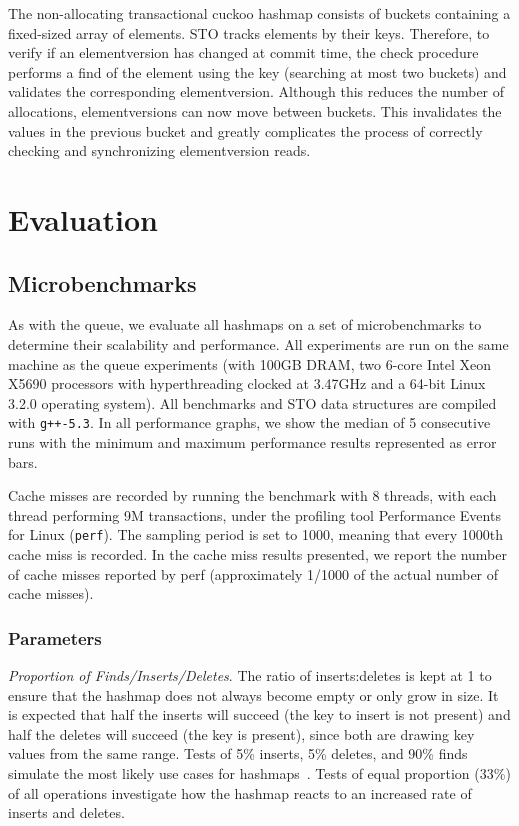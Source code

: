 The non-allocating transactional cuckoo hashmap consists of buckets containing a fixed-sized array of elements. STO tracks elements by their keys. Therefore, to verify if an elementversion has changed at commit time, the check procedure performs a find of the element using the key (searching at most two buckets) and validates the corresponding elementversion. Although this reduces the number of allocations, elementversions can now move between buckets. This invalidates the values in the previous bucket and greatly complicates the process of correctly checking and synchronizing elementversion reads.

\section{Evaluation}

\subsection{Microbenchmarks}
As with the queue, we evaluate all hashmaps on a set of microbenchmarks to determine their scalability and performance. All experiments are run on the same machine as the queue experiments (with 100GB DRAM, two 6-core Intel Xeon X5690 processors with hyperthreading clocked at 3.47GHz and a 64-bit Linux 3.2.0 operating system). All benchmarks and STO data structures are compiled with \texttt{g++-5.3}. In all performance graphs, we show the median of 5 consecutive runs with the minimum and maximum performance results represented as error bars.

Cache misses are recorded by running the benchmark with 8 threads, with each thread performing 9M transactions, under the profiling tool Performance Events for Linux (\texttt{perf}). The sampling period is set to 1000, meaning that every 1000th cache miss is recorded.
In the cache miss results presented, we report the number of cache misses reported by perf (approximately 1/1000 of the actual number of cache misses).

\subsubsection{Parameters}

    \emph{Proportion of Finds/Inserts/Deletes}. The ratio of inserts:deletes is kept at 1 to ensure that the hashmap does not always become empty or only grow in size. It is expected that half the inserts will succeed (the key to insert is not present) and half the deletes will succeed (the key is present), since both are drawing key values from the same range. Tests of 5\% inserts, 5\% deletes, and 90\% finds simulate the most likely use cases for hashmaps~\cite{hm1}. Tests of equal proportion (33\%) of all operations investigate how the hashmap reacts to an increased rate of inserts and deletes.

